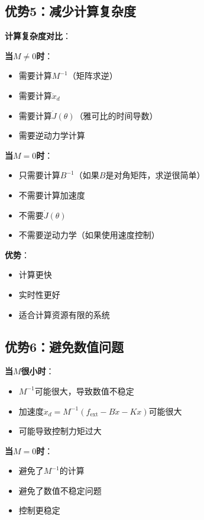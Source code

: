 \documentclass[12pt,a4paper]{article}
\begin{document}
\subsection{优势5：减少计算复杂度}

\textbf{计算复杂度对比}：

\textbf{当$M \neq 0$时}：
\begin{itemize}
\item 需要计算$M^{-1}$（矩阵求逆）
\item 需要计算$\ddot{x}_d$
\item 需要计算$\dot{J}(\theta)$（雅可比的时间导数）
\item 需要逆动力学计算
\end{itemize}

\textbf{当$M = 0$时}：
\begin{itemize}
\item 只需要计算$B^{-1}$（如果$B$是对角矩阵，求逆很简单）
\item 不需要计算加速度
\item 不需要$\dot{J}(\theta)$
\item 不需要逆动力学（如果使用速度控制）
\end{itemize}

\textbf{优势}：
\begin{itemize}
\item 计算更快
\item 实时性更好
\item 适合计算资源有限的系统
\end{itemize}

\subsection{优势6：避免数值问题}

\textbf{当$M$很小时}：
\begin{itemize}
\item $M^{-1}$可能很大，导致数值不稳定
\item 加速度$\ddot{x}_d = M^{-1}(f_{\text{ext}} - B\dot{x} - Kx)$可能很大
\item 可能导致控制力矩过大
\end{itemize}

\textbf{当$M = 0$时}：
\begin{itemize}
\item 避免了$M^{-1}$的计算
\item 避免了数值不稳定问题
\item 控制更稳定
\end{itemize}
\end{document}
